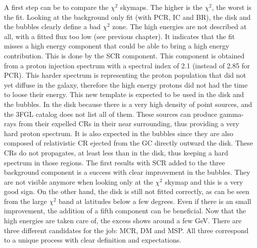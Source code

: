 A first step can be to compare the $\chi^2$ skymaps. The higher is the $\chi^2$, the worst is the fit. Looking at the background only fit (with PCR, IC and BR), the disk and the bubbles clearly define a bad $\chi^2$ zone. The high energies are not described at all, with a fitted flux too low (see previous chapter). It indicates that the fit misses a high energy component that could be able to bring a high energy contribution. This is done by the SCR component. This component is obtained from a proton injection spectrum with a spectral index of 2.1 (instead of 2.85 for PCR). This harder spectrum is representing the proton population that did not yet diffuse in the galaxy, therefore the high energy protons did not had the time to loose their energy. This new template is expected to be used in the disk and the bubbles. In the disk because there is a very high density of point sources, and the 3FGL catalog does not list all of them. These sources can produce gamma-rays from their expelled CRs in their near surrounding, thus providing a very hard proton spectrum. It is also expected in the bubbles since they are also composed of relativistic CR ejected from the GC directly outward the disk. These CRs do not propagates, at least less than in the disk, thus keeping a hard spectrum in those regions. 
The first results with SCR added to the three background component is a success with clear improvement in the bubbles. They are not visible anymore when looking only at the $\chi^2$ skymap and this is a very good sign. On the other hand, the disk is still not fitted correctly, as can be seen from the large $\chi^2$ band at latitudes below a few degrees. Even if there is an small improvement, the addition of a fifth component can be beneficial.
Now that the high energies are taken care of, the excess shows around a few GeV. There are three different candidates for the job: MCR, DM and MSP. All three correspond to a unique process with clear definition and expectations.

